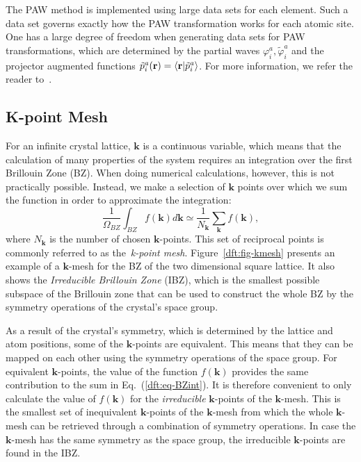 \begin{refsection}
The PAW method is implemented using large data sets for each element. Such a 
data set governs exactly how the PAW transformation works for each atomic 
site. One has a large degree of freedom when generating data sets for PAW 
transformations, which are determined by the partial waves 
$\varphi_i^a,\tilde{\varphi}_i^a$ and the projector augmented functions 
$\tilde{p}_i^a(\mathbf{r}) = \braket{\mathbf{r} |\tilde{p}_i^a}$. For more 
information, we refer the reader to~\cite{Rostgaard2009}. 
 
\subsection{K-point Mesh} \label{dft:sec-kpoints} 
 
For an infinite crystal lattice, $\mathbf{k}$ is a continuous variable, which 
means that the calculation of many properties of the system requires an 
integration over the first Brillouin Zone (BZ). When doing numerical 
calculations, however, this is not practically possible. Instead, we make a 
selection of $\mathbf{k}$ points over which we sum the function in order to 
approximate the integration: 
\begin{equation}\label{dft:eq-BZint} 
\frac{1}{\Omega_{BZ}}\int_{BZ} f(\mathbf{k}) d\mathbf{k} \simeq 
\frac{1}{N_\mathbf{k}} \sum_\mathbf{k} f(\mathbf{k}), 
\end{equation} 
where $N_\mathbf{k}$ is the number of chosen $\mathbf{k}$-points. This set of 
reciprocal points is commonly referred to as the~\textit{k-point mesh}. 
Figure~\ref{dft:fig-kmesh} presents an example of a $\mathbf{k}$-mesh for the BZ 
of the two dimensional square lattice. It also shows the \textit{Irreducible 
Brillouin Zone} (IBZ), which is the smallest possible subspace of the 
Brillouin zone that can be used to construct the whole BZ by the symmetry 
operations of the crystal's space group.  
 
As a result of the crystal's symmetry, which is determined by the lattice and 
atom positions, some of the $\mathbf{k}$-points are equivalent. This means 
that they can be mapped on each other using the symmetry operations of the 
space group. For equivalent $\mathbf{k}$-points, the value of the function 
$f(\mathbf{k})$ provides the same contribution to the sum in 
Eq.~(\ref{dft:eq-BZint}). It is therefore convenient to only calculate the value 
of $f(\mathbf{k})$ for the \textit{irreducible} $\mathbf{k}$-points of the 
$\mathbf{k}$-mesh. This is the smallest set of inequivalent 
$\mathbf{k}$-points of the $\mathbf{k}$-mesh from which the whole 
$\mathbf{k}$-mesh can be retrieved through a combination of symmetry 
operations. In case the $\mathbf{k}$-mesh has the same symmetry as the space 
group, the irreducible $\mathbf{k}$-points are found in the IBZ. 
 

\end{refsection}
